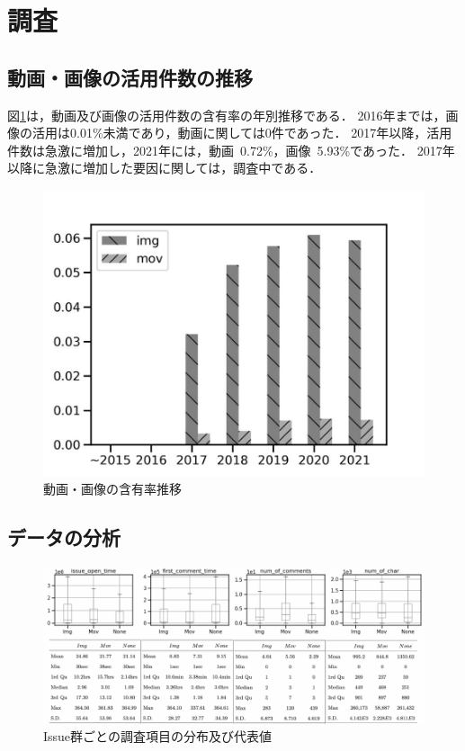 \section{調査}
\subsection{動画・画像の活用件数の推移}
図\ref{content_trend}は，動画及び画像の活用件数の含有率の年別推移である．
2016年までは，画像の活用は0.01\%未満であり，動画に関しては0件であった．
2017年以降，活用件数は急激に増加し，2021年には，動画~0.72\%，画像~5.93\%であった．
2017年以降に急激に増加した要因に関しては，調査中である．

\begin{figure}[t]
  \begin{center}
      \includegraphics[scale=0.5]{./image/data_content_trends.pdf}
      \caption{動画・画像の含有率推移 \label{content_trend}}
  \end{center}
\end{figure}

\subsection{データの分析}

\begin{figure}[t]
  \begin{center}
      \includegraphics[scale=1.1]{./image/dataset_plot.pdf}
      \caption{Issue群ごとの調査項目の分布及び代表値 \label{dataset_plot}}
  \end{center}
\end{figure}

